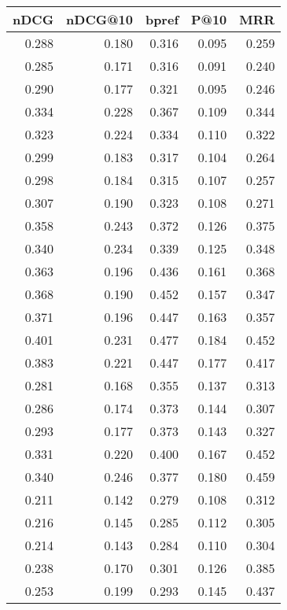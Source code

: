 \begin{tabular}{rrrrr}
\toprule
nDCG & nDCG@10 & bpref & P@10 & MRR \\
\midrule
0.288 & 0.180 & 0.316 & 0.095 & 0.259 \\
0.285 & 0.171 & 0.316 & 0.091 & 0.240 \\
0.290 & 0.177 & 0.321 & 0.095 & 0.246 \\
0.334 & 0.228 & 0.367 & 0.109 & 0.344 \\
0.323 & 0.224 & 0.334 & 0.110 & 0.322 \\
0.299 & 0.183 & 0.317 & 0.104 & 0.264 \\
0.298 & 0.184 & 0.315 & 0.107 & 0.257 \\
0.307 & 0.190 & 0.323 & 0.108 & 0.271 \\
0.358 & 0.243 & 0.372 & 0.126 & 0.375 \\
0.340 & 0.234 & 0.339 & 0.125 & 0.348 \\
0.363 & 0.196 & 0.436 & 0.161 & 0.368 \\
0.368 & 0.190 & 0.452 & 0.157 & 0.347 \\
0.371 & 0.196 & 0.447 & 0.163 & 0.357 \\
0.401 & 0.231 & 0.477 & 0.184 & 0.452 \\
0.383 & 0.221 & 0.447 & 0.177 & 0.417 \\
0.281 & 0.168 & 0.355 & 0.137 & 0.313 \\
0.286 & 0.174 & 0.373 & 0.144 & 0.307 \\
0.293 & 0.177 & 0.373 & 0.143 & 0.327 \\
0.331 & 0.220 & 0.400 & 0.167 & 0.452 \\
0.340 & 0.246 & 0.377 & 0.180 & 0.459 \\
0.211 & 0.142 & 0.279 & 0.108 & 0.312 \\
0.216 & 0.145 & 0.285 & 0.112 & 0.305 \\
0.214 & 0.143 & 0.284 & 0.110 & 0.304 \\
0.238 & 0.170 & 0.301 & 0.126 & 0.385 \\
0.253 & 0.199 & 0.293 & 0.145 & 0.437 \\
\bottomrule
\end{tabular}
